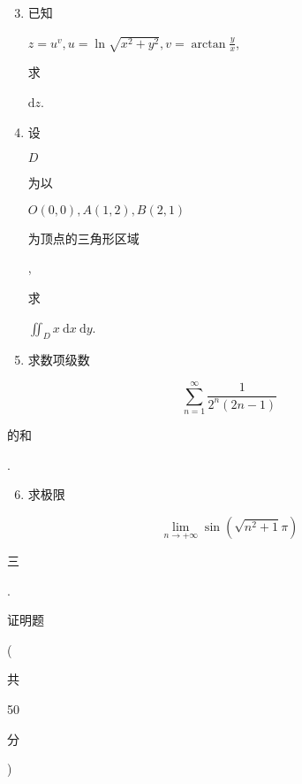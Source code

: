 \documentclass[10pt]{article}
\begin{document}
\begin{enumerate}
  \setcounter{enumi}{2}
  \item \begin{CJK}{UTF8}{mj}已知\end{CJK} $z=u^{v}, u=\ln \sqrt{x^{2}+y^{2}}, v=\arctan \frac{y}{x}$, \begin{CJK}{UTF8}{mj}求\end{CJK} $\mathrm{d} z$.

  \item \begin{CJK}{UTF8}{mj}设\end{CJK} $D$ \begin{CJK}{UTF8}{mj}为以\end{CJK} $O(0,0), A(1,2), B(2,1)$ \begin{CJK}{UTF8}{mj}为顶点的三角形区域\end{CJK}, \begin{CJK}{UTF8}{mj}求\end{CJK} $\iint_{D} x \mathrm{~d} x \mathrm{~d} y$.

  \item \begin{CJK}{UTF8}{mj}求数项级数\end{CJK}

\end{enumerate}
$$
\sum_{n=1}^{\infty} \frac{1}{2^{n}(2 n-1)}
$$
\begin{CJK}{UTF8}{mj}的和\end{CJK}.

\begin{enumerate}
  \setcounter{enumi}{5}
  \item \begin{CJK}{UTF8}{mj}求极限\end{CJK}
\end{enumerate}
$$
\lim _{n \rightarrow+\infty} \sin \left(\sqrt{n^{2}+1} \pi\right)
$$
\begin{CJK}{UTF8}{mj}三\end{CJK}. \begin{CJK}{UTF8}{mj}证明题\end{CJK} (\begin{CJK}{UTF8}{mj}共\end{CJK} 50 \begin{CJK}{UTF8}{mj}分\end{CJK})
\end{document}
